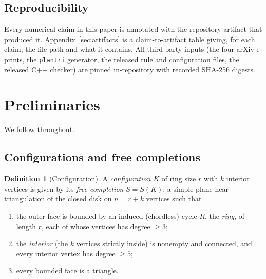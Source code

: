 \documentclass[11pt]{article}
\theoremstyle{definition}
\newtheorem{definition}[theorem]{Definition}
\begin{document}
\subsection{Reproducibility}

Every numerical claim in this paper is annotated with the repository artifact that
produced it. Appendix~\ref{sec:artifacts} is a claim-to-artifact table giving, for
each claim, the file path and what it contains. All third-party inputs (the four
arXiv e-prints, the \texttt{plantri} generator, the released rule and configuration
files, the released C++ checker) are pinned in-repository with recorded SHA-256
digests.

\section{Preliminaries}
\label{sec:prelim}

We follow \cite{rsst-reduce,rsst1997} throughout.

\subsection{Configurations and free completions}

\begin{definition}[Configuration]
A \emph{configuration} $K$ of ring size $r$ with $k$ interior vertices is given by
its \emph{free completion} $S=S(K)$: a simple plane near-triangulation of the closed
disk on $n=r+k$ vertices such that
\begin{enumerate}
  \item the outer face is bounded by an induced (chordless) cycle $R$, the
        \emph{ring}, of length $r$, each of whose vertices has degree $\ge 3$;
  \item the \emph{interior} (the $k$ vertices strictly inside) is nonempty and
        connected, and every interior vertex has degree $\ge 5$;
  \item every bounded face is a triangle.
\end{enumerate}
\end{definition}
\end{document}
